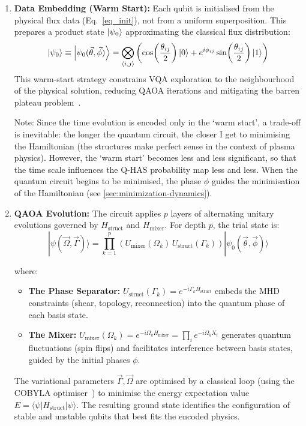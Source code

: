 \documentclass[12pt, a4paper, oneside]{report}
\begin{document}
\begin{enumerate}
    \item \textbf{Data Embedding (Warm Start):}
    Each qubit is initialised from the physical flux data (Eq.~\ref{eq_init}), not from a uniform superposition. This prepares a product state $\ket{\psi_0}$ approximating the classical flux distribution:
    \begin{equation}
        \ket{\psi_0} \equiv \ket{\psi_0(\vec{\theta},\vec{\phi})} = \bigotimes_{\langle i,j \rangle} \left( \cos\!\left(\frac{\theta_{ij}}{2}\right)\ket{0} + e^{i\phi_{ij}}\sin\!\left(\frac{\theta_{ij}}{2}\right)\ket{1} \right)
    \end{equation}
    This warm-start strategy constrains VQA exploration to the neighbourhood of the physical solution, reducing QAOA iterations and mitigating the barren plateau problem~\cite{mcclean2018}.

    Note: Since the time evolution is encoded only in the ‘warm start’, a trade-off is inevitable: the longer the quantum circuit, the closer I get to minimising the Hamiltonian (the structures make perfect sense in the context of plasma physics). However, the ‘warm start’ becomes less and less significant, so that the time scale influences the Q-HAS probability map less and less. When the quantum circuit begins to be minimised, the phase $\phi$ guides the minimisation of the Hamiltonian (see \ref{sec:minimization-dynamics}).

    \item \textbf{QAOA Evolution:}
    The circuit applies $p$ layers of alternating unitary evolutions governed by $H_{\text{struct}}$ and $H_{\text{mixer}}$. For depth $p$, the trial state is:
    \begin{equation}
        |\psi(\vec{\Omega},\vec{\Gamma})\rangle = \prod_{k=1}^{p} \left( U_{\text{mixer}}(\Omega_k)\, U_{\text{struct}}(\Gamma_k) \right) |\psi_0(\vec{\theta},\vec{\phi})\rangle
    \end{equation}

    where:
    \begin{itemize}
        \item \textbf{The Phase Separator:} $U_{\text{struct}}(\Gamma_k) = e^{-i\Gamma_k H_{\text{struct}}}$ embeds the MHD constraints (shear, topology, reconnection) into the quantum phase of each basis state.
        \item \textbf{The Mixer:} $U_{\text{mixer}}(\Omega_k) = e^{-i\Omega_k H_{\text{mixer}}} = \prod_i e^{-i\Omega_k X_i}$ generates quantum fluctuations (spin flips) and facilitates interference between basis states, guided by the initial phases $\phi$.
    \end{itemize}

The variational parameters $\vec{\Gamma}, \vec{\Omega}$ are optimised by a classical loop (using the COBYLA optimiser~\cite{powell1994}) to minimise the energy expectation value $E = \langle \psi | H_{\text{struct}} | \psi \rangle$. The resulting ground state identifies the configuration of stable and unstable qubits that best fits the encoded physics.

\end{enumerate}
\end{document}
